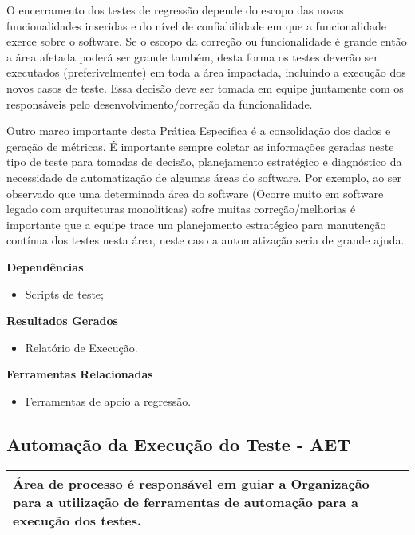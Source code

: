 O encerramento dos testes de regressão depende do escopo das novas funcionalidades inseridas e do nível de confiabilidade em que a funcionalidade exerce sobre o software. Se o escopo da correção ou funcionalidade é grande então a área afetada poderá ser grande também, desta forma os testes deverão ser executados (preferivelmente) em toda a área impactada, incluindo a execução dos novos casos de teste. Essa decisão deve ser tomada em equipe juntamente com os responsáveis pelo desenvolvimento/correção da funcionalidade.

Outro marco importante desta Prática Especifica é a consolidação dos dados e geração de métricas. É importante sempre coletar as informações geradas neste tipo de teste para tomadas de decisão, planejamento estratégico e diagnóstico da necessidade de automatização de algumas áreas do software. Por exemplo, ao ser observado que uma determinada área do software (Ocorre muito em software legado com arquiteturas monolíticas) sofre muitas correção/melhorias é importante que a equipe trace um planejamento estratégico para manutenção contínua dos testes nesta área, neste caso a automatização seria de grande ajuda.


\textbf{Dependências}
\begin{itemize}
    \item Scripts de teste;
\end{itemize}

\textbf{Resultados Gerados}
\begin{itemize}
    \item Relatório de Execução.
\end{itemize}

\textbf{Ferramentas Relacionadas}
\begin{itemize}
    \item Ferramentas de apoio a regressão.
\end{itemize}

\subsection{Automação da Execução do Teste - AET}
\label{sec:aet}

\begin{table}[H]
\centering
\begin{tabular}{|p{130mm}|}
\hline
Área de processo é responsável em guiar a Organização para a utilização de ferramentas de automação para a execução dos testes. \\ 
\hline
\end{tabular}
\end{table}

